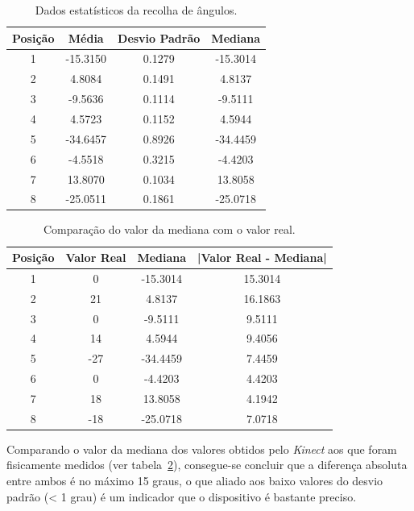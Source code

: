 \begin{table}[h!]
\begin{center}
\begin{tabular} { c c c c }
 Posição & Média & Desvio Padrão & Mediana \\
\hline
	1 & -15.3150 &0.1279 & -15.3014 \\
	2 & 4.8084 &0.1491 & 4.8137 \\
	3 &  -9.5636 &0.1114 &-9.5111\\
	4 &  4.5723 &0.1152 & 4.5944 \\
	5 & -34.6457 &0.8926 &-34.4459 \\
	6 & -4.5518 & 0.3215 &-4.4203 \\
	7 & 13.8070 & 0.1034 &  13.8058 \\
	8 & -25.0511 & 0.1861 &  -25.0718 \\
\hline
\end{tabular}
	\caption{Dados estatísticos da recolha de ângulos.}
	\label{res:exp_res_obtidos_est_ang}
\end{center}
\end{table}


\begin{table}[h!]
\begin{center}
\begin{tabular} { c c c c }
 Posição & Valor Real & Mediana & |Valor Real - Mediana| \\
\hline
	1 & 0 & -15.3014 & 15.3014 \\
	2 & 21 & 4.8137 & 16.1863 \\
	3 & 0 & -9.5111& 9.5111\\
	4 & 14 & 4.5944 & 9.4056\\
	5 & -27 & -34.4459 & 7.4459 \\
	6 & 0 & -4.4203 & 4.4203 \\
	7 & 18 & 13.8058 & 4.1942 \\
	8 & -18 & -25.0718 & 7.0718 \\
\hline
\end{tabular}
	\caption{Comparação do valor da mediana com o valor real.}
	\label{res:exp_res_obtidos_est_ang_comp}
\end{center}
\end{table}



Comparando o valor da mediana dos valores obtidos pelo \emph{Kinect} aos que foram fisicamente medidos (ver tabela~\ref{res:exp_res_obtidos_est_ang_comp}), consegue-se concluir que a diferença absoluta entre ambos é no máximo 15 graus, o que aliado aos baixo valores do desvio padrão (< 1 grau) é um indicador que o dispositivo é bastante preciso. 

